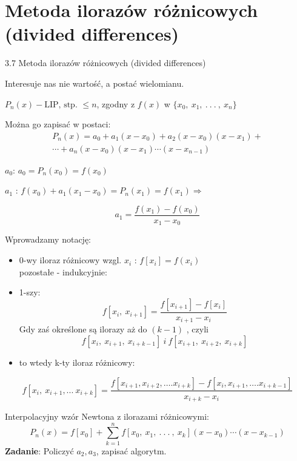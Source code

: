 \section{Metoda ilorazów różnicowych (divided differences)}
\begin{frame}
{3.7 Metoda ilorazów różnicowych (divided differences)}

Interesuje nas nie wartość, a postać wielomianu.

$P_{n}(x)-\text{LIP, stp. } \leq n$, zgodny z $f(x)$ w $\{x_{0},\ x_{1},\ .\ .\ .\ ,\ x_{n}\}$

Można go zapisać w postaci:
\begin{equation*}\begin{split}
P_{n}(x)=a_{0}+a_{1}(x-x_{0})+a_{2}(x-x_{0})(x-x_{1})+ \\
\cdots+a_{n}(x-x_{0})(x-x_{1})\cdots(x-x_{n-1})
\end{split}
\end{equation*}

$a_{0}$: $a_{0}=P_{n}(x_{0})=f(x_{0})$

$a_{1}$ : $f(x_{0})+a_{1}(x_{1}-x_{0})=P_{n}(x_{1})=f(x_{1}) \Rightarrow$

$$
a_{1}=\frac{f(x_{1})-f(x_{0})}{x_{1}-x_{0}}
$$
\end{frame}

\begin{frame}
Wprowadzamy notację:
\begin{itemize}
\item 0-wy iloraz różnicowy wzgl. $x_{i}$ : $f[x_{i}]=f(x_{i})$ \\
pozostałe - indukcyjnie:

\item 1-szy:
$$
f[x_{i},\ x_{i+1}]=\frac{f[x_{i+1}]-f[x_{i}]}{x_{i+1}-x_{i}}
$$
Gdy zaś określone są ilorazy aż do $(k-1)$ , czyli
$$
f[x_{i},\ x_{i+1},\ x_{i+k-1}] \: i \: f[x_{i+1},\ x_{i+2},\ x_{i+k}]
$$
\item to wtedy k-ty iloraz różnicowy:
\end{itemize}
$$
f[x_{i},\ x_{i+1}, ...\ x_{i+k}]=\frac{f[x_{i+1},x_{i+2},\ldots.x_{i+k}]-f[x_{i},x_{i+1},\ldots.x_{i+k-1}]}{x_{i+k}-x_{i}}
$$
\end{frame}

\begin{frame}
Interpolacyjny wzór Newtona z ilorazami różnicowymi:
$$
P_{n}(x)=f[x_{0}]+\sum_{k=1}^{n}f[x_{0},\ x_{1},\ .\ .\ .\ ,\ x_{k}](x-x_{0})\cdots(x-x_{k-1})
$$
\textbf{Zadanie}: Policzyć $a_{2}, a_{3}$, zapisać algorytm.

\end{frame}

